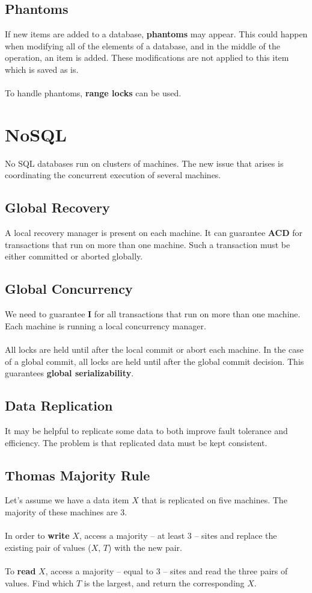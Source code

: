 \documentclass{article}
\begin{document}
\subsection{Phantoms}
If new items are added to a database, \textbf{phantoms} may appear. This could happen when modifying all of the elements of a database, and in the middle of the operation, an item is added. These modifications are not applied to this item which is saved as is. \\ \\
To handle phantoms, \textbf{range locks} can be used.

\section{NoSQL}
No SQL databases run on clusters of machines. The new issue that arises is coordinating the concurrent execution of several machines.

\subsection{Global Recovery}
A local recovery manager is present on each machine. It can guarantee \textbf{ACD} for transactions that run on more than one machine. Such a transaction must be either committed or aborted globally.

\subsection{Global Concurrency}
We need to guarantee \textbf{I} for all transactions that run on more than one machine. Each machine is running a local concurrency manager. \\ \\
All locks are held until after the local commit or abort each machine. In the case of a global commit, all locks are held until after the global commit decision. This guarantees \textbf{global serializability}.

\subsection{Data Replication}
It may be helpful to replicate some data to both improve fault tolerance and efficiency. The problem is that replicated data must be kept consistent.

\subsection{Thomas Majority Rule}
Let's assume we have a data item $X$ that is replicated on five machines. The majority of these machines are 3. \\ \\
In order to \textbf{write} $X$, access a majority -- at least 3 -- sites and replace the existing pair of values ($X$, $T$) with the new pair. \\ \\
To \textbf{read} $X$, access a majority -- equal to 3 -- sites and read the three pairs of values. Find which $T$ is the largest, and return the corresponding $X$.
\end{document}
